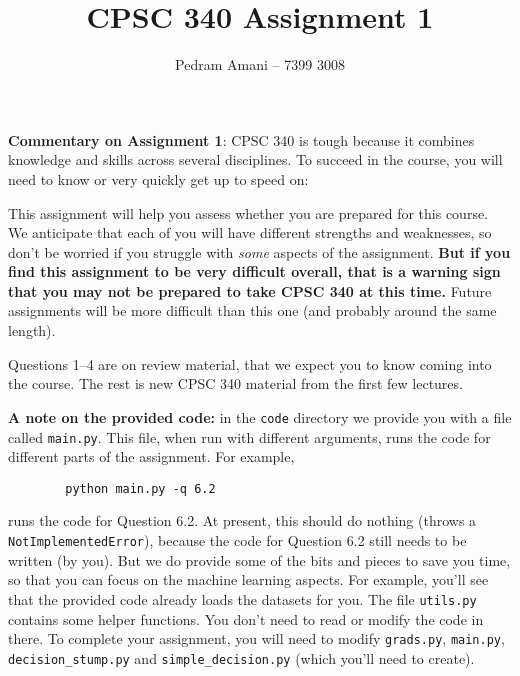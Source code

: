 \documentclass{article}
\begin{document}
    \title{CPSC 340 Assignment 1}
    \author{Pedram Amani -- 7399 3008}
    \date{}
    \maketitle

    \textbf{Commentary on Assignment 1}: CPSC 340 is tough because it combines knowledge and skills across several disciplines. To succeed in the course, you will need to know or very quickly get up to speed on:


    This assignment will help you assess whether you are prepared for this course. We anticipate that each of you will have different strengths and weaknesses, so don't be worried if you struggle with \emph{some} aspects of the assignment. \textbf{But if you find this assignment to be very difficult overall, that is a warning sign that you may not be prepared to take CPSC 340 at this time.} Future assignments will be more difficult than this one (and probably around the same length).

    Questions 1--4 are on review material, that we expect you to know coming into the course. The rest is new CPSC 340 material from the first few lectures.

    \textbf{A note on the provided code:} in the \texttt{code} directory we provide you with a file called \texttt{main.py}. This file, when run with different arguments, runs the code for different parts of the assignment. For example,

    \begin{verbatim}
        python main.py -q 6.2
    \end{verbatim}

    runs the code for Question 6.2. At present, this should do nothing (throws a \texttt{NotImplementedError}), because the code for Question 6.2 still needs to be written (by you). But we do provide some of the bits and pieces to save you time, so that you can focus on the machine learning aspects. For example, you'll see that the provided code already loads the datasets for you. The file \texttt{utils.py} contains some helper functions. You don't need to read or modify the code in there. To complete your assignment, you will need to modify \texttt{grads.py}, \texttt{main.py}, \texttt{decision\string_stump.py} and \texttt{simple\string_decision.py} (which you'll need to create).
\end{document}

